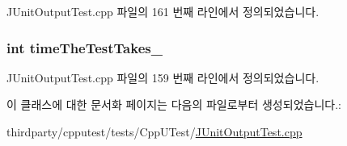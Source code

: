 J\+Unit\+Output\+Test.\+cpp 파일의 161 번째 라인에서 정의되었습니다.

\subsubsection[{\texorpdfstring{time\+The\+Test\+Takes\+\_\+}{timeTheTestTakes_}}]{\setlength{\rightskip}{0pt plus 5cm}int time\+The\+Test\+Takes\+\_\+\hspace{0.3cm}{\ttfamily [private]}}\hypertarget{class_j_unit_test_output_test_runner_a8b698df0e57add2de8378df388c5fd19}{}\label{class_j_unit_test_output_test_runner_a8b698df0e57add2de8378df388c5fd19}


J\+Unit\+Output\+Test.\+cpp 파일의 159 번째 라인에서 정의되었습니다.



이 클래스에 대한 문서화 페이지는 다음의 파일로부터 생성되었습니다.\+:\begin{DoxyCompactItemize}
\item 
thirdparty/cpputest/tests/\+Cpp\+U\+Test/\hyperlink{_j_unit_output_test_8cpp}{J\+Unit\+Output\+Test.\+cpp}\end{DoxyCompactItemize}
